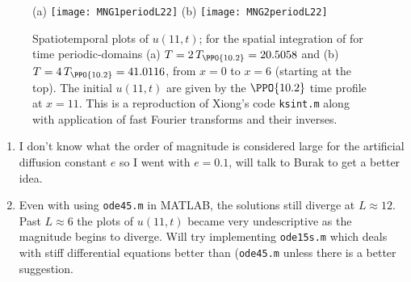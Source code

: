\begin{description}
{\begin{description}
\begin{figure}
  (a) \texttt{[image: MNG1periodL22]}
  (b) \texttt{[image: MNG2periodL22]}
\caption{
Spatiotemporal plots of $u(11,t)$; for the spatial integration of
 for time periodic-domains
(a) $T= 2\,T_{\PPO{10.2}} =20.5058$ and
(b) $T=4\,T_{\PPO{10.2}} = 41.0116$, from $x=0$ to $x=6$ (starting at the top).
The initial $u(11,t)$
are given by the $\PPO{10.2}$ time profile at $x=11$.
This is a reproduction
of Xiong's code \texttt{ksint.m} along with
application of fast Fourier transforms and their inverses.
\label{fig:MNGspaceIntL22}
}
\end{figure}

\item[Concerns]
\begin{enumerate}
 \item
 I don't know what the order of magnitude is considered large for the artificial diffusion constant $e$ so I went with $e=0.1$, will talk to Burak to get a better idea.
\item
Even with using \texttt{ode45.m} in MATLAB, the solutions still diverge at $L \approx 12$. Past $L \approx 6$ the plots of $u(11,t)$ became very undescriptive as the magnitude begins to diverge. Will try implementing \texttt{ode15s.m} which deals with stiff differential equations better than (\texttt{ode45.m} unless there is a better suggestion.
\end{enumerate}
\end{description}
    }

\end{description}

